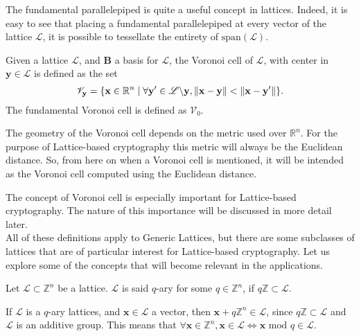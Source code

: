 \begin{remark}
The fundamental parallelepiped is quite a useful concept in lattices. Indeed, it is easy to see that placing a fundamental parallelepiped at every vector of the lattice $\mathscr{L}$, it is possible to tessellate the entirety of $\mathrm{span}(\mathscr{L})$.
\end{remark}

\begin{definition}
Given a lattice $\mathscr{L}$, and $\mathbf{B}$ a basis for $\mathscr{L}$, the Voronoi cell of $\mathscr{L}$, with center in $\mathbf{y}\in\mathscr{L}$ is defined as the set
\begin{equation*}
\mathscr{V}_\mathbf{y} = \{\mathbf{x}\in\mathbb{R}^n\mid\forall \mathbf{y}' \in \mathscr{L}\backslash\mathbf{y}, \left\lVert \mathbf{x}-\mathbf{y} \right\rVert < \left\lVert \mathbf{x}-\mathbf{y}' \right\rVert \}.
\end{equation*}
The fundamental Voronoi cell is defined as $\mathscr{V}_0$. 
\end{definition}

\begin{remark}
The geometry of the Voronoi cell depends on the metric used over $\mathbb{R}^n$. For the purpose of Lattice-based cryptography this metric will always be the Euclidean distance. So, from here on when a Voronoi cell is mentioned, it will be intended as the Voronoi cell computed using the Euclidean distance.
\end{remark}

The concept of Voronoi cell is especially important for Lattice-based cryptography. The nature of this importance will be discussed in more detail later.\\
All of these definitions apply to Generic Lattices, but there are some subclasses of lattices that are of particular interest for Lattice-based cryptography. Let us explore some of the concepts that will become relevant in the applications.

\begin{definition}
Let $\mathscr{L}\subset\mathbb{Z}^n$ be a lattice. $\mathscr{L}$ is said $q$-ary for some $q\in\mathbb{Z}^n$, if $q\mathbb{Z}\subset\mathscr{L}$.
\end{definition} 

\begin{remark}
If $\mathscr{L}$ is a $q$-ary lattices, and $\mathbf{x}\in\mathscr{L}$ a vector, then $\mathbf{x}+q\mathbb{Z}^n\in\mathscr{L}$, since $q\mathbb{Z}\subset\mathscr{L}$ and $\mathscr{L}$ is an additive group. This means that $\forall\mathbf{x}\in\mathbb{Z}^n, \mathbf{x}\in\mathscr{L}\Leftrightarrow\mathbf{x}$ $\mathrm{mod}$ $q\in\mathscr{L}$.
\end{remark}

